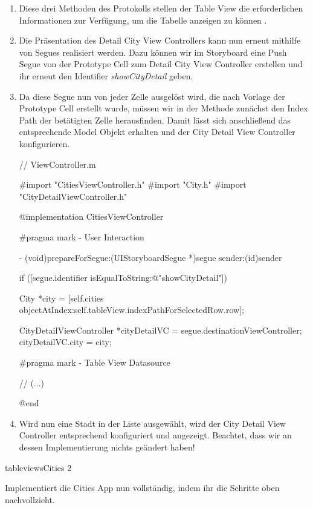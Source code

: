 \documentclass[parskip=half, final]{scrreprt}
\begin{document}
\begin{lecture}
\begin{enumerate}
\item Diese drei Methoden des  Protokolls stellen der Table View die erforderlichen Informationen zur Verfügung, um die Tabelle anzeigen zu können .


\item Die Präsentation des Detail City View Controllers kann nun erneut mithilfe von Segues realisiert werden. Dazu können wir im Storyboard eine Push Segue von der Prototype Cell zum Detail City View Controller erstellen und ihr erneut den Identifier \emph{showCityDetail} geben.

\item Da diese Segue nun von jeder Zelle ausgelöst wird, die nach Vorlage der Prototype Cell erstellt wurde, müssen wir in der  Methode zunächst den Index Path der betätigten Zelle herausfinden. Damit lässt sich anschließend das entsprechende Model Objekt erhalten und der City Detail View Controller konfigurieren.

\begin{objclst}
//  ViewController.m

#import "CitiesViewController.h"
#import "City.h"
#import "CityDetailViewController.h"

@implementation CitiesViewController

#pragma mark - User Interaction

- (void)prepareForSegue:(UIStoryboardSegue *)segue sender:(id)sender
{
    if ([segue.identifier isEqualToString:@"showCityDetail"]) {

        City *city = [self.cities objectAtIndex:self.tableView.indexPathForSelectedRow.row];
        
        CityDetailViewController *cityDetailVC = segue.destinationViewController;
        cityDetailVC.city = city;
    }
}

#pragma mark - Table View Datasource

// (...)

@end
\end{objclst}

\item Wird nun eine Stadt in der Liste ausgewählt, wird der City Detail View Controller entsprechend konfiguriert und angezeigt. Beachtet, dass wir an dessen Implementierung nichts geändert haben!

\end{enumerate}

\begin{exc}

\begin{excitem}{tableviews}{Cities 2}

Implementiert die Cities App nun vollständig, indem ihr die Schritte oben nachvollzieht.

\end{excitem}

\end{exc}


\end{lecture}
\end{document}
